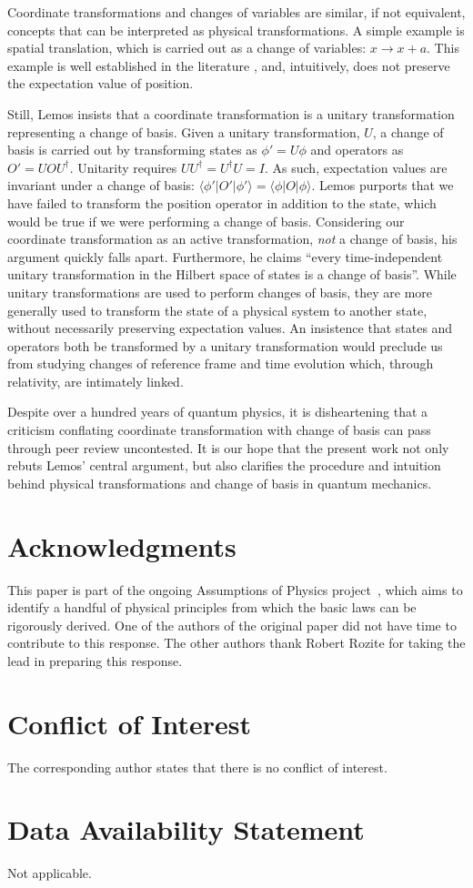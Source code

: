 \documentclass[pdflatex,sn-mathphys-num]{sn-jnl}
\begin{document}
Coordinate transformations and changes of variables are similar, if not equivalent, concepts that can be interpreted as physical transformations. A simple example is spatial translation, which is carried out as a change of variables: $x \rightarrow x + a$. This example is well established in the literature \cite{gottfried1, binney}, and, intuitively, does not preserve the expectation value of position.

Still, Lemos insists that a coordinate transformation is a unitary transformation representing a change of basis. Given a unitary transformation, \(U\), a change of basis is carried out by transforming states as \(\phi' = U \phi\) and operators as \(O' = UOU^\dag\). Unitarity requires \(UU^\dag = U^\dag U = I\). As such, expectation values are invariant under a change of basis: \(\langle \phi' | O' | \phi' \rangle = \langle \phi | O | \phi \rangle\). Lemos purports that we have failed to transform the position operator in addition to the state, which would be true if we were performing a change of basis. Considering our coordinate transformation as an active transformation, \textit{not} a change of basis, his argument quickly falls apart. Furthermore, he claims ``every time-independent unitary transformation in the Hilbert space of states is a change of basis''. While unitary transformations are used to perform changes of basis, they are more generally used to transform the state of a physical system to another state, without necessarily preserving expectation values. An insistence that states and operators both be transformed by a unitary transformation would preclude us from studying changes of reference frame and time evolution which, through relativity, are intimately linked.

Despite over a hundred years of quantum physics, it is disheartening that a criticism conflating coordinate transformation with change of basis can pass through peer review uncontested. It is our hope that the present work not only rebuts Lemos' central argument, but also clarifies the procedure and intuition behind physical transformations and change of basis in quantum mechanics. 






\section*{Acknowledgments}
This paper is part of the ongoing Assumptions of Physics project~\cite{aop-book}, which aims to identify a handful of physical principles from which the basic laws can be rigorously derived. One of the authors of the original paper did not have time to contribute to this response. The other authors thank Robert Rozite for taking the lead in preparing this response. 


\section*{Conflict of Interest}
The corresponding author states that there is no conflict of interest.
\section*{Data Availability Statement}
Not applicable.

\end{document}
